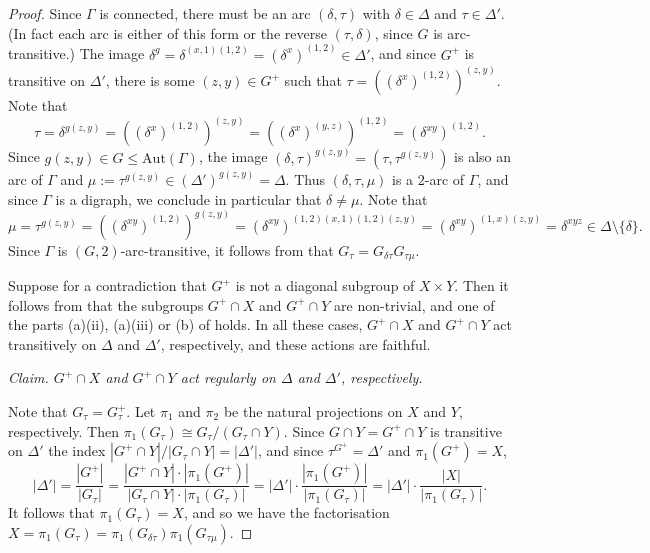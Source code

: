 \documentclass[11pt]{amsart}
\newcommand{\Aut}{\mathrm{Aut}}
\begin{document}
\begin{proof}
    Since \(\Gamma\) is connected, there must be an arc $(\delta, \tau)$ with $\delta\in\Delta$ and $\tau\in\Delta'$. (In fact each arc is either of this form or the reverse $(\tau,\delta)$, since $G$ is arc-transitive.) The image $\delta^g = \delta^{(x,1)(1,2)} = (\delta^x)^{(1,2)}\in \Delta'$, and since $G^+$ is transitive on $\Delta'$, there is some $(z,y)\in G^+$ such that $\tau=((\delta^x)^{(1,2)})^{(z,y)}$. Note that 
    \[
    \tau=   \delta^{g(z,y)}= ((\delta^x)^{(1,2)})^{(z,y)} = ((\delta^x)^{(y,z)})^{(1,2)} = 
    (\delta^{xy})^{(1,2)}.
    \]
    Since $g(z,y)\in G\leqslant \Aut(\Gamma)$, the image $(\delta,\tau)^{g(z,y)}=(\tau,\tau^{g(z,y)})$ is also an arc of $\Gamma$ and $\mu:= \tau^{g(z,y)}\in (\Delta')^{g(z,y)}=\Delta$. Thus $(\delta,\tau,\mu)$ is a $2$-arc of $\Gamma$, and since $\Gamma$ is a digraph, we conclude in particular that $\delta\ne\mu$. Note that 
    \begin{equation}\label{e:mu}
    \mu= \tau^{g(z,y)} = ((\delta^{xy})^{(1,2)})^{g(z,y)}
    = (\delta^{xy})^{(1,2)(x,1)(1,2)(z,y)} = (\delta^{xy})^{(1,x)(z,y)} =\delta^{xyz} \in \Delta\setminus\{\delta\}.
    \end{equation}
    Since \(\Gamma\) is \((G,2)\)-arc-transitive, it follows from \cite[Lemma 2.3]{quasi} that \(G_{\tau}=G_{\delta\tau}G_{\tau\mu}\).
    
    Suppose for a contradiction that \(G^+\) is not a diagonal subgroup of $X\times Y$. Then it follows from \cite[Theorem 1.1]{Praeger03} that the subgroups \(G^+\cap X\) and \(G^+\cap Y\) are non-trivial, and one of the parts (a)(ii), (a)(iii) or (b) of \cite[Theorem 1.1]{Praeger03} holds. In all these cases, \(G^+\cap X\) and \(G^+\cap Y\)  act transitively on \(\Delta\) and \(\Delta'\), respectively, and these actions are faithful.

\medskip\noindent
\emph{Claim. \(G^+\cap X\) and \(G^+\cap Y\)  act regularly on \(\Delta\) and \(\Delta'\), respectively.}

    \smallskip
    Note that \(G_{\tau}=G^{+}_{\tau}\). Let \(\pi_{1}\) and \(\pi_{2}\) be the natural projections on \(X\) and \(Y\), respectively. Then  \(\pi_{1}(G_{\tau})\cong G_{\tau}/(G_{\tau}\cap Y)\). Since \(G\cap Y=G^+\cap Y\) is transitive on \(\Delta'\) the index \(|G^+\cap Y|/|G_{\tau}\cap Y|=|\Delta'|\), and since \(\tau^{G^+}=\Delta'\) and \(\pi_{1}(G^+)=X\),  
    \[
    |\Delta'|=\frac{|G^+|}{|G_{\tau}|}=\frac{|G^+\cap Y|\cdot|\pi_{1}(G^+)|}{|G_{\tau}\cap Y|\cdot|{\pi_{1}}(G_{\tau})|}=|\Delta'|\cdot\frac{|\pi_{1}(G^+)|}{|{\pi_{1}}(G_{\tau})|}=|\Delta'|\cdot\frac{|X|}{|\pi_{1}(G_{\tau})|}.
    \]
    It follows that \(\pi_{1}(G_{\tau})=X\), and so we have  the factorisation $X=\pi_{1}(G_{\tau})=\pi_{1}(G_{\delta\tau})\pi_{1}(G_{\tau\mu})$. 
    

\end{proof}
\end{document}
